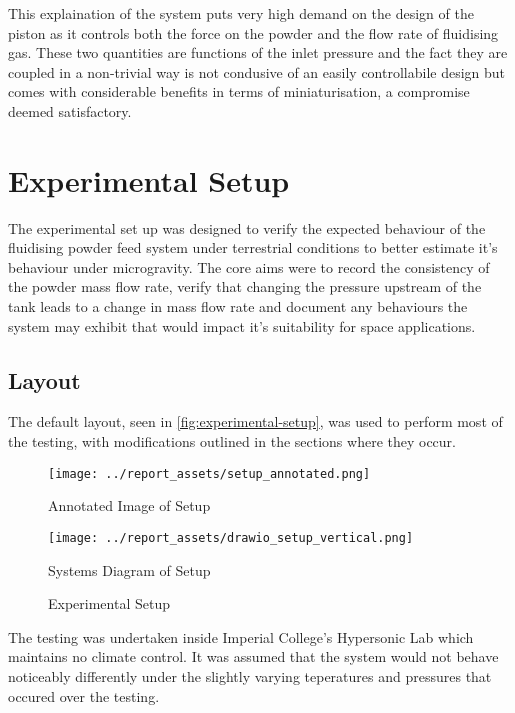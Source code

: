 This explaination of the system puts very high demand on the design of the piston as it controls both the force on the powder and the flow rate of fluidising gas. These two quantities are functions of the inlet pressure and the fact they are coupled in a non-trivial way is not condusive of an easily controllabile design but comes with considerable benefits in terms of miniaturisation, a compromise deemed satisfactory.

\section{Experimental Setup}
The experimental set up was designed to verify the expected behaviour of the fluidising powder feed system under terrestrial conditions to better estimate it's behaviour under microgravity. The core aims were to record the consistency of the powder mass flow rate, verify that changing the pressure upstream of the tank leads to a change in mass flow rate and document any behaviours the system may exhibit that would impact it's suitability for space applications.

\subsection{Layout}
The default layout, seen in \autoref{fig:experimental-setup}, was used to perform most of the testing, with modifications outlined in the sections where they occur. 
\begin{figure}[htbp]
    \centering

    \begin{minipage}{0.6\textwidth}
        \centering
        \texttt{[image: ../report\_assets/setup\_annotated.png]}
        \caption*{Annotated Image of Setup}
    \end{minipage}
    \hfill
    \begin{minipage}{0.3\textwidth}
        \centering
        \texttt{[image: ../report\_assets/drawio\_setup\_vertical.png]}
        \caption*{Systems Diagram of Setup}
    \end{minipage}
    \caption{Experimental Setup}\label{fig:experimental-setup}
\end{figure}
The testing was undertaken inside Imperial College's Hypersonic Lab which maintains no climate control. It was assumed that the system would not behave noticeably differently under the slightly varying teperatures and pressures that occured over the testing.

